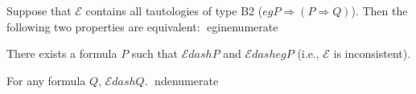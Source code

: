 Suppose that $\mathcal{E}$ contains all tautologies of type B2 ($
eg P \Rightarrow (P \Rightarrow Q)$). Then the following two properties are equivalent:
egin{enumerate}
\item[(a)] There exists a formula $P$ such that $\mathcal{E} dash P$ and $\mathcal{E} dash 
eg P$ (i.e., $\mathcal{E}$ is inconsistent).
\item[(b)] For any formula $Q$, $\mathcal{E} dash Q$.
nd{enumerate}
